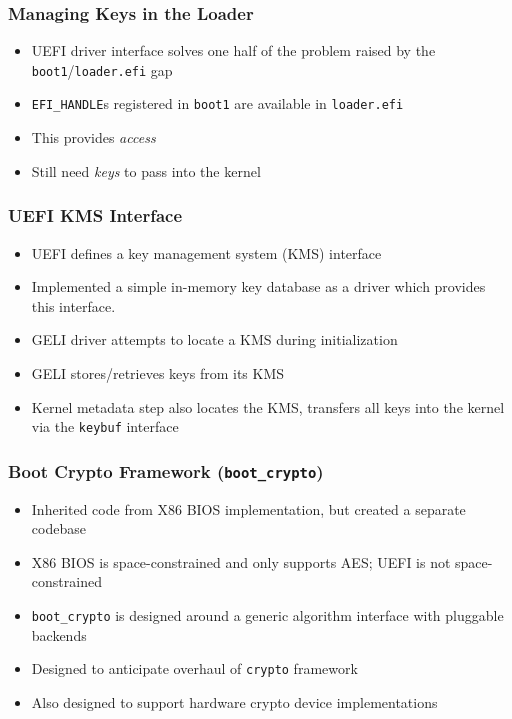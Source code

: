 \documentclass{beamer}
\begin{document}
\begin{frame}
  \frametitle{Managing Keys in the Loader}
  \begin{itemize}
  \item UEFI driver interface solves one half of the problem raised by
    the \texttt{boot1}/\texttt{loader.efi} gap
  \item \texttt{EFI\_HANDLE}s registered in \texttt{boot1} are available
    in \texttt{loader.efi}
  \item This provides \emph{access}
  \item Still need \emph{keys} to pass into the kernel
  \end{itemize}
\end{frame}

\begin{frame}
  \frametitle{UEFI KMS Interface}
  \begin{itemize}
  \item UEFI defines a key management system (KMS) interface
  \item Implemented a simple in-memory key database as a driver which
    provides this interface.
  \item GELI driver attempts to locate a KMS during initialization
  \item GELI stores/retrieves keys from its KMS
  \item Kernel metadata step also locates the KMS, transfers all keys
    into the kernel via the \texttt{keybuf} interface
  \end{itemize}
\end{frame}

\begin{frame}
  \frametitle{Boot Crypto Framework (\texttt{boot\_crypto})}
  \begin{itemize}
  \item Inherited code from X86 BIOS implementation, but created a
    separate codebase
  \item X86 BIOS is space-constrained and only supports AES; UEFI is
    not space-constrained
  \item \texttt{boot\_crypto} is designed around a generic algorithm
    interface with pluggable backends
  \item Designed to anticipate overhaul of \texttt{crypto} framework
  \item Also designed to support hardware crypto device implementations
  \end{itemize}
\end{frame}
\end{document}
